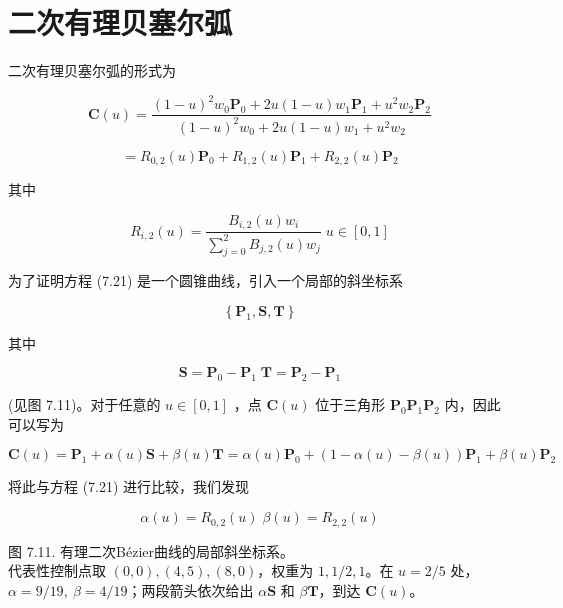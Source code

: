 \documentclass[../main.tex]{subfiles}
\begin{document}
\section{二次有理贝塞尔弧}

二次有理贝塞尔弧的形式为

\[
\mathbf{C}\left( u\right)  = \frac{{\left( 1 - u\right) }^{2}{w}_{0}{\mathbf{P}}_{0} + {2u}\left( {1 - u}\right) {w}_{1}{\mathbf{P}}_{1} + {u}^{2}{w}_{2}{\mathbf{P}}_{2}}{{\left( 1 - u\right) }^{2}{w}_{0} + {2u}\left( {1 - u}\right) {w}_{1} + {u}^{2}{w}_{2}}
\]

\[
= {R}_{0,2}\left( u\right) {\mathbf{P}}_{0} + {R}_{1,2}\left( u\right) {\mathbf{P}}_{1} + {R}_{2,2}\left( u\right) {\mathbf{P}}_{2} \tag{7.21}
\]

其中

\[
{R}_{i,2}\left( u\right)  = \frac{{B}_{i,2}\left( u\right) {w}_{i}}{\mathop{\sum }\limits_{{j = 0}}^{2}{B}_{j,2}\left( u\right) {w}_{j}}\;u \in  \left\lbrack  {0,1}\right\rbrack
\]

为了证明方程 (7.21) 是一个圆锥曲线，引入一个局部的斜坐标系

\[
\left\{  {{\mathbf{P}}_{1},\mathbf{S},\mathbf{T}}\right\}   \tag{7.22}
\]

其中

\[
\mathbf{S} = {\mathbf{P}}_{0} - {\mathbf{P}}_{1}\;\mathbf{T} = {\mathbf{P}}_{2} - {\mathbf{P}}_{1}
\]

(见图 7.11)。对于任意的 \(u \in  \left\lbrack  {0,1}\right\rbrack\) ，点 \(\mathbf{C}\left( u\right)\) 位于三角形 \({\mathbf{P}}_{0}{\mathbf{P}}_{1}{\mathbf{P}}_{2}\) 内，因此可以写为

\[
\mathbf{C}\left( u\right)  = {\mathbf{P}}_{1} + \alpha \left( u\right) \mathbf{S} + \beta \left( u\right) \mathbf{T} = \alpha \left( u\right) {\mathbf{P}}_{0} + \left( {1 - \alpha \left( u\right)  - \beta \left( u\right) }\right) {\mathbf{P}}_{1} + \beta \left( u\right) {\mathbf{P}}_{2} \tag{7.23}
\]

将此与方程 (7.21) 进行比较，我们发现

\[
\alpha \left( u\right)  = {R}_{0,2}\left( u\right) \;\beta \left( u\right)  = {R}_{2,2}\left( u\right)  \tag{7.24}
\]

\begin{center}
\begin{minipage}{18cm}
\vspace*{.6\baselineskip}
\centering
{}
\par\smallskip
图 7.11. 有理二次Bézier曲线的局部斜坐标系。\\
代表性控制点取 $(0,0),(4,5),(8,0)$，权重为 $1,1/2,1$。在 $u=2/5$ 处，$\alpha=9/19,\ \beta=4/19$；两段箭头依次给出 $\alpha\mathbf S$ 和 $\beta\mathbf T$，到达 $\mathbf C(u)$。
\end{minipage}
\end{center}
\end{document}
